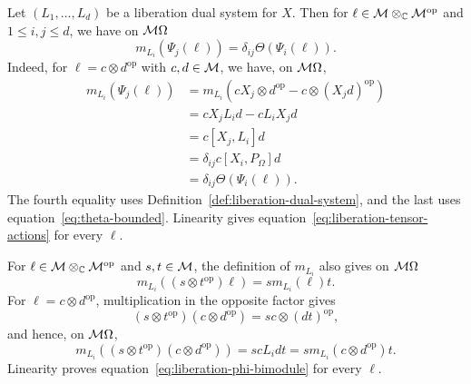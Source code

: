 Let $(L_1,\ldots,L_d)$ be a liberation dual system for $X$.
Then for $\ell\in\mathcal M\otimes_{\mathbb C}\mathcal M^{\mathrm{op}}$ and $1\leq i,j\leq d$, we have on $\mathcal M\Omega$
\begin{equation}\label{eq:liberation-tensor-actions}
 m_{L_i}(\Psi_j(\ell))=\delta_{ij}\Theta(\Psi_i(\ell)).
\end{equation}
Indeed, for $\ell=c\otimes d^{\mathrm{op}}$ with $c,d\in\mathcal M$, we have, on $\mathcal M\Omega$,
\[
 \begin{aligned}
 m_{L_i}(\Psi_j(\ell))
 &=m_{L_i}(cX_j\otimes d^{\mathrm{op}}-c\otimes(X_jd)^{\mathrm{op}})\\
 &=cX_jL_id-cL_iX_jd\\
 &=c[X_j,L_i]d\\
 &=\delta_{ij}c[X_i,P_\Omega]d\\
 &=\delta_{ij}\Theta(\Psi_i(\ell)).
 \end{aligned}
\]
The fourth equality uses Definition~\ref{def:liberation-dual-system}, and the last uses equation~\eqref{eq:theta-bounded}.
Linearity gives equation~\eqref{eq:liberation-tensor-actions} for every $\ell$.

For $\ell\in\mathcal M\otimes_{\mathbb C}\mathcal M^{\mathrm{op}}$ and $s,t\in\mathcal M$, the definition of $m_{L_i}$ also gives on $\mathcal M\Omega$
\begin{equation}\label{eq:liberation-phi-bimodule}
 m_{L_i}((s\otimes t^{\mathrm{op}})\ell)=sm_{L_i}(\ell)t.
\end{equation}
For $\ell=c\otimes d^{\mathrm{op}}$, multiplication in the opposite factor gives
\[
 (s\otimes t^{\mathrm{op}})(c\otimes d^{\mathrm{op}})
 =sc\otimes(dt)^{\mathrm{op}},
\]
and hence, on $\mathcal M\Omega$,
\[
 m_{L_i}((s\otimes t^{\mathrm{op}})(c\otimes d^{\mathrm{op}}))
 =scL_idt
 =sm_{L_i}(c\otimes d^{\mathrm{op}})t.
\]
Linearity proves equation~\eqref{eq:liberation-phi-bimodule} for every $\ell$.

